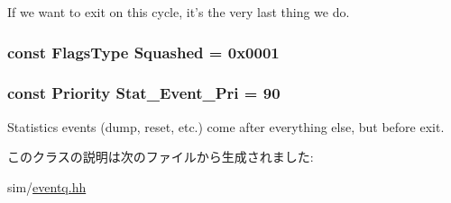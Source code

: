 \label{classEventBase_a0e91729fc98f99e73e3d13cb18cb123f}
If we want to exit on this cycle, it's the very last thing we do. \hypertarget{classEventBase_aa538a6b12172092ac14b1c53ed0b5623}{
\subsubsection[{Squashed}]{\setlength{\rightskip}{0pt plus 5cm}const {\bf FlagsType} {\bf Squashed} = 0x0001}}
\label{classEventBase_aa538a6b12172092ac14b1c53ed0b5623}
\hypertarget{classEventBase_aa2e7a615a821276480098db993be1fdd}{
\subsubsection[{Stat\_\-Event\_\-Pri}]{\setlength{\rightskip}{0pt plus 5cm}const {\bf Priority} {\bf Stat\_\-Event\_\-Pri} = 90}}
\label{classEventBase_aa2e7a615a821276480098db993be1fdd}
Statistics events (dump, reset, etc.) come after everything else, but before exit. 

このクラスの説明は次のファイルから生成されました:\begin{DoxyCompactItemize}
\item 
sim/\hyperlink{eventq_8hh}{eventq.hh}\end{DoxyCompactItemize}
